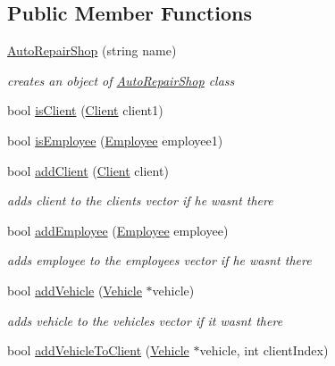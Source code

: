 \subsection*{Public Member Functions}
\begin{DoxyCompactItemize}
\item 
\hypertarget{class_auto_repair_shop_abfd899870a9e0840ce888f8cfad6cb4c}{}\hyperlink{class_auto_repair_shop_abfd899870a9e0840ce888f8cfad6cb4c}{Auto\+Repair\+Shop} (string name)\label{class_auto_repair_shop_abfd899870a9e0840ce888f8cfad6cb4c}

\begin{DoxyCompactList}\small\item\em creates an object of \hyperlink{class_auto_repair_shop}{Auto\+Repair\+Shop} class \end{DoxyCompactList}\item 
bool \hyperlink{class_auto_repair_shop_a51b51e852827d936df828b34abc19eaf}{is\+Client} (\hyperlink{class_client}{Client} client1)
\item 
bool \hyperlink{class_auto_repair_shop_a9d1534c8de54c5a34958e04222c4a93b}{is\+Employee} (\hyperlink{class_employee}{Employee} employee1)
\item 
bool \hyperlink{class_auto_repair_shop_ab7141a5910487566c637497dcef4c26c}{add\+Client} (\hyperlink{class_client}{Client} client)
\begin{DoxyCompactList}\small\item\em adds client to the clients vector if he wasn\textquotesingle{}t there \end{DoxyCompactList}\item 
bool \hyperlink{class_auto_repair_shop_a8e5171bd079137114eba615753a07a82}{add\+Employee} (\hyperlink{class_employee}{Employee} employee)
\begin{DoxyCompactList}\small\item\em adds employee to the employees vector if he wasn\textquotesingle{}t there \end{DoxyCompactList}\item 
bool \hyperlink{class_auto_repair_shop_a9259c08b180733698c8f2e16b38c8d08}{add\+Vehicle} (\hyperlink{class_vehicle}{Vehicle} $\ast$vehicle)
\begin{DoxyCompactList}\small\item\em adds vehicle to the vehicles vector if it wasn\textquotesingle{}t there \end{DoxyCompactList}\item 
bool \hyperlink{class_auto_repair_shop_a0633fa187ade7238e569234befcc8d06}{add\+Vehicle\+To\+Client} (\hyperlink{class_vehicle}{Vehicle} $\ast$vehicle, int client\+Index)

\end{DoxyCompactItemize}
